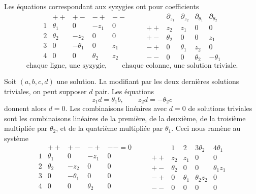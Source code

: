 \documentclass[11pt]{article}
\begin{document}
Les équations correspondant aux syzygies ont pour coefficients
\[
\begin{array}{c|cccc}
& ++ & +- & -+ & --\\ \hline
1& \theta_1&0&-z_1&0\\
2& \theta_2&-z_2&0&0\\
3&0&-\theta_1&0&z_1\\
4&0&0&\theta_2&z_2
\end{array}
\qquad
\begin{array}{c|cccc}
& \partial_{z_1}&\partial_{z_2}&\partial_{\theta_1}&\partial_{\theta_2}\\ \hline
++& z_2&z_1&0&0\\
+-& \theta_2&0&0&z_1\\
-+&0&\theta_1&z_2&0\\
--&0&0&\theta_2&-\theta_1
\end{array}
\]
\[
\text{chaque ligne, une syzygie},\qquad
\text{chaque colonne, une solution triviale}.
\]

Soit $(a,b,c,d)$ une solution. La modifiant par les deux dernières solutions triviales, on peut supposer $d$ pair. Les équations
\[
  z_1d=\theta_1 b,
  \qquad
  z_2d=-\theta_2 c
\]
donnent alors $d=0$. Les combinaisons linéaires avec $d=0$ de solutions triviales sont les combinaisons linéaires de la première, de la deuxième, de la troisième multipliée par $\theta_2$, et de la quatrième multipliée par $\theta_1$. Ceci nous ramène au système
\[
\begin{array}{c|cccc}
& ++&+-&-+&--=0\\ \hline
1&\theta_1&0&-z_1&0\\
2&\theta_2&-z_2&0&0\\
3&0&-\theta_1&0&0\\
4&0&0&\theta_2&0
\end{array}
\qquad
\begin{array}{c|cccc}
&1&2&3\theta_2&4\theta_1\\ \hline
++&z_2&z_1&0&0\\
+-&\theta_2&0&0&\theta_1z_1\\
-+&0&\theta_1&\theta_2z_2&0\\
--&0&0&0&0
\end{array}
\]
\end{document}
